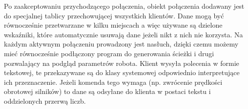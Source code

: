 Po zaakceptowaniu przychodzącego połączenia, obiekt połączenia dodawany jest do specjalnej tablicy przechowującej wszystkich klientów. 
Dane mogą być równocześnie przetwarzane w kilku miejscach a więc używane są dzielone wskaźniki, które automatycznie usuwają dane jeżeli nikt z nich nie korzysta.
Na każdym aktywnym połączeniu prowadzony jest nasłuch, dzięki czemu możemy mieć równocześnie podłączony program do generowania ścieżki i drugi pozwalający na podgląd parametrów robota.
Klient wysyła polecenia w formie tekstowej, te przekazywane są do klasy systemowej odpowiednio interpretujące ich przeznaczenie.
Jeżeli komenda tego wymaga (np. zwrócenie prędkości obrotowej silników) to dane są odsyłane do klienta w postaci tekstu i oddzielonych przerwą liczb. 


